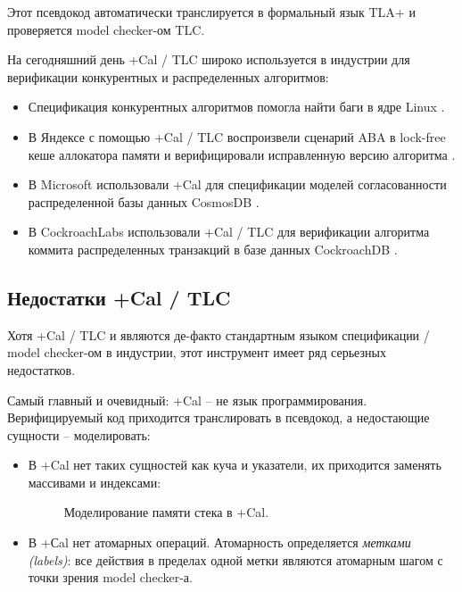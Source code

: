Этот псевдокод автоматически транслируется в формальный язык TLA+ и проверяется model checker-ом TLC. 

На сегодняшний день +Cal / TLC широко используется в индустрии для верификации конкурентных и распределенных алгоритмов: 

\begin{itemize}
	
\item	Спецификация конкурентных алгоритмов помогла найти баги в ядре Linux \autocite{LinuxConf} \autocite{LinuxSpec}.

\item	В Яндексе с помощью +Cal / TLC воспроизвели сценарий ABA в lock-free кеше аллокатора памяти \autocite{YaAlloc} и верифицировали исправленную версию алгоритма \autocite{YaSpec}.

\item	В Microsoft использовали +Cal для спецификации моделей согласованности распределенной базы данных CosmosDB \autocite{MsSpec}.

\item	В CockroachLabs использовали +Cal / TLC для верификации алгоритма коммита распределенных транзакций в базе данных CockroachDB \autocite{CockroachSpec}.

\end{itemize}


\subsection{Недостатки +Cal / TLC}

Хотя +Cal / TLC и являются де-факто стандартным языком спецификации / model checker-ом в индустрии, этот инструмент имеет ряд серьезных недостатков.

Самый главный и очевидный: +Cal – не язык программирования. Верифицируемый код приходится транслировать в псевдокод, а недостающие сущности – моделировать:

\begin{itemize}

\item   В +Cal нет таких сущностей как куча и указатели, их приходится заменять массивами и индексами:

\begin{figure}
	\bigskip
	\caption{Моделирование памяти стека в +Cal.}\label{fig:calmem}
\end{figure}

\item   В +Сal нет атомарных операций. Атомарность определяется \emph{метками (labels)}: все действия в пределах одной метки являются атомарным шагом с точки зрения model checker-а. 

\end{itemize}

